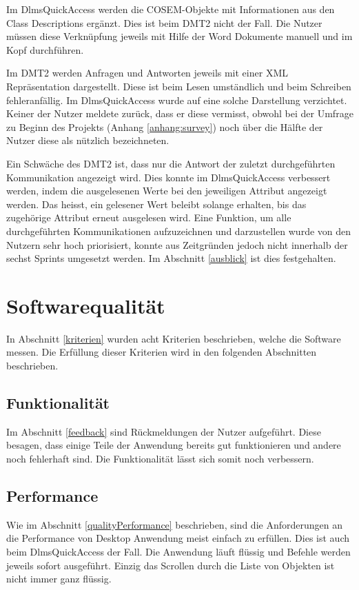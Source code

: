 Im DlmsQuickAccess werden die \ac{COSEM}-Objekte mit Informationen aus den Class Descriptions ergänzt.
Dies ist beim \ac{DMT2} nicht der Fall.
Die Nutzer müssen diese Verknüpfung jeweils mit Hilfe der Word Dokumente manuell und im Kopf durchführen.

Im \ac{DMT2} werden Anfragen und Antworten jeweils mit einer XML Repräsentation dargestellt.
Diese ist beim Lesen umständlich und beim Schreiben fehleranfällig.
Im DlmsQuickAccess wurde auf eine solche Darstellung verzichtet.
Keiner der Nutzer meldete zurück, dass er diese vermisst, obwohl bei der Umfrage zu Beginn des Projekts (Anhang \ref{anhang:survey}) noch über die Hälfte der Nutzer diese als nützlich bezeichneten.

Ein Schwäche des \ac{DMT2} ist, dass nur die Antwort der zuletzt durchgeführten Kommunikation angezeigt wird.
Dies konnte im DlmsQuickAccess verbessert werden, indem die ausgelesenen Werte bei den jeweiligen Attribut angezeigt werden.
Das heisst, ein gelesener Wert beleibt solange erhalten, bis das zugehörige Attribut erneut ausgelesen wird.
Eine Funktion, um alle durchgeführten Kommunikationen aufzuzeichnen und darzustellen wurde von den Nutzern sehr hoch priorisiert, konnte aus Zeitgründen jedoch nicht innerhalb der sechst Sprints umgesetzt werden.
Im Abschnitt \ref{ausblick} ist dies festgehalten.



\section{Softwarequalität}\label{evalQuality}
In Abschnitt \ref{kriterien} wurden acht Kriterien beschrieben, welche die Software messen.
Die Erfüllung dieser Kriterien wird in den folgenden Abschnitten beschrieben.

\subsection{Funktionalität}
Im Abschnitt \ref{feedback} sind Rückmeldungen der Nutzer aufgeführt.
Diese besagen, dass einige Teile der Anwendung bereits gut funktionieren und andere noch fehlerhaft sind.
Die Funktionalität lässt sich somit noch verbessern.

\subsection{Performance}
Wie im Abschnitt \ref{qualityPerformance} beschrieben, sind die Anforderungen an die Performance von Desktop Anwendung meist einfach zu erfüllen.
Dies ist auch beim DlmsQuickAccess der Fall.
Die Anwendung läuft flüssig und Befehle werden jeweils sofort ausgeführt.
Einzig das Scrollen durch die Liste von Objekten ist nicht immer ganz flüssig.

